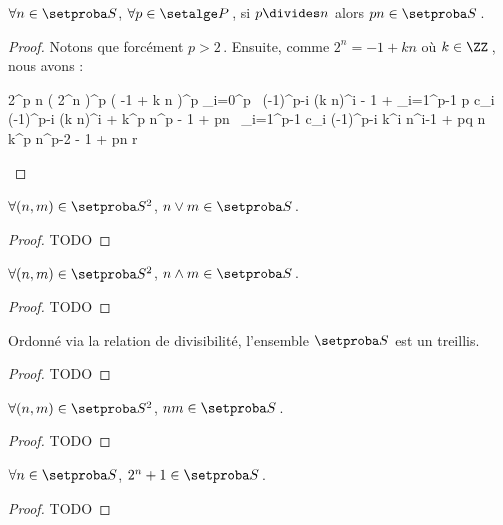 \begin{fact}
	$\forall n \in \ourset$, $\forall p \in \primeset$\,,
	si $p \divides n$ alors $p n \in \ourset$\,.
\end{fact}

\begin{proof}
	Notons que forcément $p > 2$\,.
	Ensuite, comme $2^n = -1 + k n$ où $k \in \ZZ$\,,
	nous avons :
    
    \medskip
    
    \begin{stepcalc}[style=sar]
    	2^{p n}
    \explnext{}
    	\big( 2^n \big)^p
    \explnext{}
    	\big( -1 + k n \big)^p
    \explnext{}
    	\dsum_{i=0}^p  \, (-1)^{p-i} \cdot (k n)^i
    	- 1 + \dsum_{i=1}^{p-1} p c_i \cdot (-1)^{p-i} \cdot (k n)^i + k^p \cdot n^p
    	- 1 + pn \, \dsum_{i=1}^{p-1} c_i \cdot (-1)^{p-i} \cdot k^i n^{i-1} + pq \cdot n \cdot k^p \cdot n^{p-2}
    \explnext{}
    	- 1 + pn \cdot r
    \end{stepcalc}

    \vspace{-1ex}
    \null
\end{proof}




\begin{fact}
	$\forall (n , m) \in \ourset^2$, $n \vee m \in \ourset$\,.
\end{fact}

\begin{proof}
	TODO
\end{proof}




\begin{fact}
	$\forall (n , m) \in \ourset^2$, $n \wedge m \in \ourset$\,.
\end{fact}

\begin{proof}
	TODO
\end{proof}




\begin{fact}
	Ordonné via la relation de divisibilité, l'ensemble $\ourset$ est un treillis.
\end{fact}

\begin{proof}
	TODO
\end{proof}




\begin{fact}
	$\forall (n , m) \in \ourset^2$, $n m \in \ourset$\,.
\end{fact}

\begin{proof}
	TODO
\end{proof}




\begin{fact}
	$\forall n \in \ourset$, $2^n + 1 \in \ourset$\,.
\end{fact}

\begin{proof}
	TODO
\end{proof}

